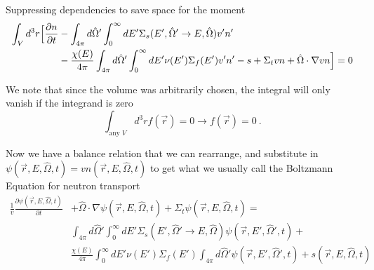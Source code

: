 \documentclass[12pt]{article}
\newlength{\up}
\newcommand{\vOmega}{\ensuremath{\hat{\Omega}}}
\begin{document}
Suppressing dependencies to save space for the moment
%
\begin{align}
\int_V d^3r \Bigl[\frac{\partial n}{\partial t} &- 
\int_{4\pi} d\vOmega' \int_0^{\infty} dE' \Sigma_s(E', \vOmega' \rightarrow E, \vOmega) v' n' \nonumber\\&-
\frac{\chi(E)}{4\pi} \int_{4\pi} d\vOmega' \int_0^{\infty} dE' \nu(E') \Sigma_f(E') v' n' -
s +
\Sigma_t v n + 
\vOmega \cdot \nabla v n \Bigr] = 0
\end{align}

We note that since the volume was arbitrarily chosen, the integral will only vanish if the integrand is zero 
\[\int_{\text{any }V} d^3r f(\vec{r}) = 0 \rightarrow f(\vec{r}) = 0 \:.\]

Now we have a balance relation that we can rearrange, and substitute in $\psi(\vec{r}, E, \vOmega, t) = vn(\vec{r}, E, \vOmega, t)$ to get what we usually call the Boltzmann Equation for neutron transport
%
\begin{align}
\frac{1}{v}\frac{\partial \psi(\vec{r}, E, \vOmega, t)}{\partial t} &+ 
\vOmega \cdot \nabla \psi(\vec{r}, E, \vOmega, t) +
\Sigma_t \psi(\vec{r}, E, \vOmega, t) = \nonumber\\
%
& \int_{4\pi} d\vOmega' \int_0^{\infty} dE' \Sigma_s(E', \vOmega' \rightarrow E, \vOmega) \psi(\vec{r}, E', \vOmega', t)  +\nonumber\\
%
& \frac{\chi(E)}{4\pi} \int_0^{\infty} dE' \nu(E') \Sigma_f(E') \int_{4\pi} d\vOmega' \psi(\vec{r}, E', \vOmega', t) +
s(\vec{r}, E, \vOmega, t)
\end{align}

\end{document}
